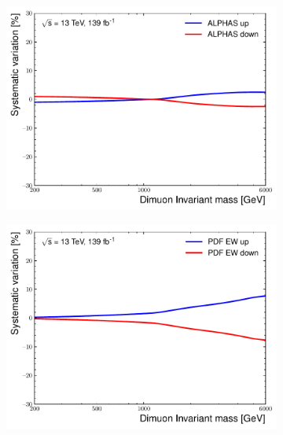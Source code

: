 \begin{figure}[h!]
    \centering
    \begin{subfigure}[h]{0.42\textwidth}
        \includegraphics[width=\textwidth]{figures/analysis/datamc/Uncertainties/theory/mm/backgroundTemplate_KF_ALPHAS__1up.pdf}
        \label{fig:uncert:mmalpha}
    \end{subfigure}
    \begin{subfigure}[h]{0.42\textwidth}
        \centering
        \includegraphics[width=\textwidth]{figures/analysis/datamc/Uncertainties/theory/mm/backgroundTemplate_KF_PDF_EW__1up.pdf}
        \label{fig:uncert:mmEW}
    \end{subfigure}
    \begin{subfigure}[h]{0.42\textwidth}

\end{subfigure}
\end{figure}
